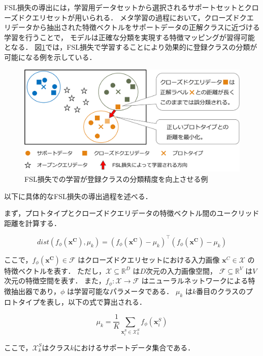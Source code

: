 \documentclass[a4paper,11pt,nomag]{jsreport}
\begin{document}
FSL損失の導出には，学習用データセットから選択されるサポートセットとクローズドクエリセットが用いられる．
メタ学習の過程において，クローズドクエリデータから抽出された特徴ベクトルをサポートデータの正解クラスに近づける学習を行うことで，
モデルは正確な分類を実現する特徴マッピングが習得可能となる．
図\ref{fig:fsl_loss}では，FSL損失で学習することにより効果的に登録クラスの分類が可能になる例を示している．
% 
\begin{figure}[tbp]
  \centering
  \includegraphics[width=\linewidth, keepaspectratio]{image/fsl_loss.png}
  \caption{FSL損失での学習が登録クラスの分類精度を向上させる例}
  \label{fig:fsl_loss}
\end{figure}
% 
以下に具体的なFSL損失の導出過程を述べる．

まず，プロトタイプとクローズドクエリデータの特徴ベクトル間のユークリッド距離を計算する．

\begin{equation}
  dist(f_{\phi}(\bm{x^C}),\mu_{k})=(f_{\phi}(\bm{x^C}) - \mu_{k})^{\top} (f_{\phi}(\bm{x^C}) - \mu_{k})
\end{equation}

\noindent
ここで，$f_{\phi}(\bm{x^C}) \in \mathcal{F}$ はクローズドクエリセットにおける入力画像 $\bm{x}^C \in \mathcal{X}$ の特徴ベクトルを表す．
ただし，$\mathcal{X} \subseteq \mathbb{R}^D$ は$D$次元の入力画像空間， $\mathcal{F} \subseteq \mathbb{R}^V$ は$V$次元の特徴空間を表す．
また，$f_{\phi}: \mathcal{X} \rightarrow \mathcal{F}$ はニューラルネットワークによる特徴抽出器であり，$\phi$ は学習可能なパラメータである．
$\mu_{k}$ は$k$番目のクラスのプロトタイプを表し，以下の式で算出される．

\begin{equation}
  \mu_{k} = \frac{1}{K} \sum_{\bm{x}^S_i \in \mathcal{X}^S_k} {f_\phi(\bm{x}^S_i)}
\end{equation}

\noindent
ここで，$\mathcal{X}^S_k$はクラス$k$におけるサポートデータ集合である．
\end{document}

